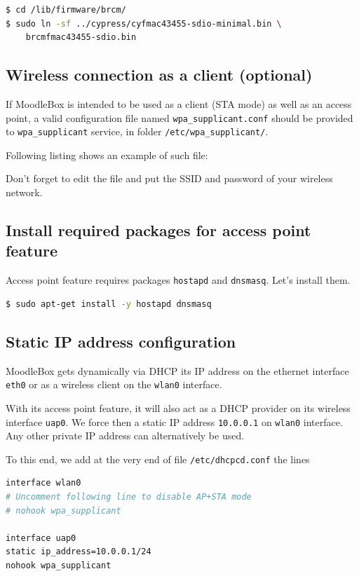 \documentclass[12pt]{article}
\begin{document}
\begin{lstlisting}[language=bash]
$ cd /lib/firmware/brcm/
$ sudo ln -sf ../cypress/cyfmac43455-sdio-minimal.bin \
    brcmfmac43455-sdio.bin
\end{lstlisting}


\subsection{Wireless connection as a client (optional)}

If MoodleBox is intended to be used as a client (STA mode) as well as an access point, a valid configuration file named \lstinline{wpa_supplicant.conf} should be provided to \lstinline{wpa_supplicant} service, in folder \lstinline{/etc/wpa_supplicant/}.

Following listing shows an example of such file:


Don't forget to edit the file and put the SSID and password of your wireless network.

\subsection{Install required packages for access point feature}

Access point feature requires packages \lstinline{hostapd} and \lstinline{dnsmasq}.
Let's install them.
\begin{lstlisting}[language=bash]
$ sudo apt-get install -y hostapd dnsmasq
\end{lstlisting}

\subsection{Static IP address configuration}

MoodleBox gets dynamically via DHCP its IP address on the ethernet interface \lstinline{eth0} or as a wireless client on the \lstinline{wlan0} interface.

With its access point feature, it will also act as a DHCP provider on its wireless interface \lstinline{uap0}.
We force then a static IP address \lstinline{10.0.0.1} on \lstinline{wlan0} interface.
Any other private IP address can alternatively be used.

To this end, we add at the very end of file \lstinline{/etc/dhcpcd.conf} the lines
\begin{lstlisting}[language=bash]
interface wlan0
# Uncomment following line to disable AP+STA mode
# nohook wpa_supplicant

interface uap0
static ip_address=10.0.0.1/24
nohook wpa_supplicant
\end{lstlisting}
\end{document}
